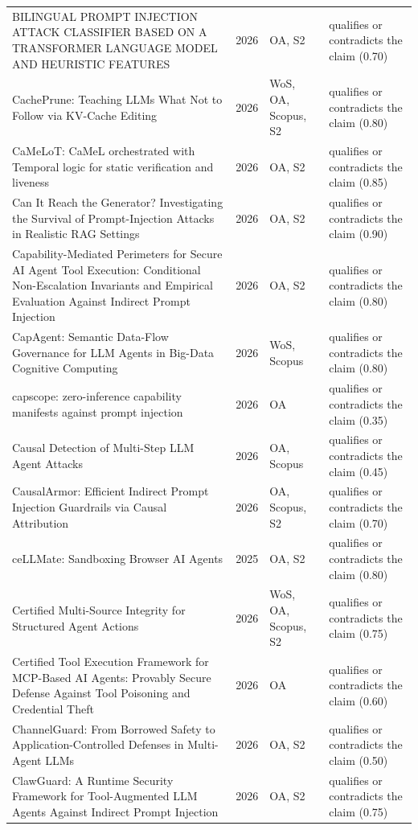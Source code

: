 \begin{longtable}{@{}%
  >{\raggedright\arraybackslash}p{}c%
  >{\raggedright\arraybackslash}p{}%
  >{\raggedright\arraybackslash}p{}@{}}
BILINGUAL PROMPT INJECTION ATTACK CLASSIFIER BASED ON A TRANSFORMER LANGUAGE MODEL AND HEURISTIC FEATURES & 2026 & OA, S2 & qualifies or contradicts the claim (0.70) \\
CachePrune: Teaching LLMs What Not to Follow via KV-Cache Editing & 2026 & WoS, OA, Scopus, S2 & qualifies or contradicts the claim (0.80) \\
CaMeLoT: CaMeL orchestrated with Temporal logic for static verification and liveness & 2026 & OA, S2 & qualifies or contradicts the claim (0.85) \\
Can It Reach the Generator? Investigating the Survival of Prompt-Injection Attacks in Realistic RAG Settings & 2026 & OA, S2 & qualifies or contradicts the claim (0.90) \\
Capability-Mediated Perimeters for Secure AI Agent Tool Execution: Conditional Non-Escalation Invariants and Empirical Evaluation Against Indirect Prompt Injection & 2026 & OA, S2 & qualifies or contradicts the claim (0.80) \\
CapAgent: Semantic Data-Flow Governance for LLM Agents in Big-Data Cognitive Computing & 2026 & WoS, Scopus & qualifies or contradicts the claim (0.80) \\
capscope: zero-inference capability manifests against prompt injection & 2026 & OA & qualifies or contradicts the claim (0.35) \\
Causal Detection of Multi-Step LLM Agent Attacks & 2026 & OA, Scopus & qualifies or contradicts the claim (0.45) \\
CausalArmor: Efficient Indirect Prompt Injection Guardrails via Causal Attribution & 2026 & OA, Scopus, S2 & qualifies or contradicts the claim (0.70) \\
ceLLMate: Sandboxing Browser AI Agents & 2025 & OA, S2 & qualifies or contradicts the claim (0.80) \\
Certified Multi-Source Integrity for Structured Agent Actions & 2026 & WoS, OA, Scopus, S2 & qualifies or contradicts the claim (0.75) \\
Certified Tool Execution Framework for MCP-Based AI Agents: Provably Secure Defense Against Tool Poisoning and Credential Theft & 2026 & OA & qualifies or contradicts the claim (0.60) \\
ChannelGuard: From Borrowed Safety to Application-Controlled Defenses in Multi-Agent LLMs & 2026 & OA, S2 & qualifies or contradicts the claim (0.50) \\
ClawGuard: A Runtime Security Framework for Tool-Augmented LLM Agents Against Indirect Prompt Injection & 2026 & OA, S2 & qualifies or contradicts the claim (0.75) \\

\end{longtable}
